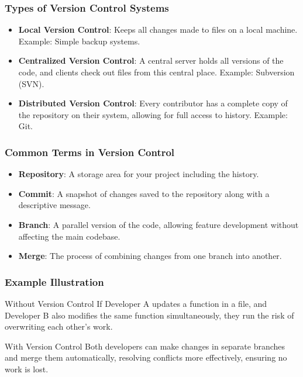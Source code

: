 \documentclass{beamer}
\begin{document}
\begin{frame}[fragile]
    \frametitle{Types of Version Control Systems}
    \begin{itemize}
        \item \textbf{Local Version Control}: Keeps all changes made to files on a local machine. Example: Simple backup systems.
        \item \textbf{Centralized Version Control}: A central server holds all versions of the code, and clients check out files from this central place. Example: Subversion (SVN).
        \item \textbf{Distributed Version Control}: Every contributor has a complete copy of the repository on their system, allowing for full access to history. Example: Git.
    \end{itemize}
\end{frame}

\begin{frame}[fragile]
    \frametitle{Common Terms in Version Control}
    \begin{itemize}
        \item \textbf{Repository}: A storage area for your project including the history.
        \item \textbf{Commit}: A snapshot of changes saved to the repository along with a descriptive message.
        \item \textbf{Branch}: A parallel version of the code, allowing feature development without affecting the main codebase.
        \item \textbf{Merge}: The process of combining changes from one branch into another.
    \end{itemize}
\end{frame}

\begin{frame}[fragile]
    \frametitle{Example Illustration}
    \begin{block}{Without Version Control}
        If Developer A updates a function in a file, and Developer B also modifies the same function simultaneously, they run the risk of overwriting each other's work.
    \end{block}
    \begin{block}{With Version Control}
        Both developers can make changes in separate branches and merge them automatically, resolving conflicts more effectively, ensuring no work is lost.
    \end{block}
\end{frame}
\end{document}
